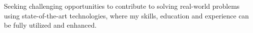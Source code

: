 


\begin{cvparagraph}
    Seeking challenging opportunities to contribute to solving real-world problems using state-of-the-art technologies, where my skills, education and experience can be fully utilized and enhanced.
\end{cvparagraph}